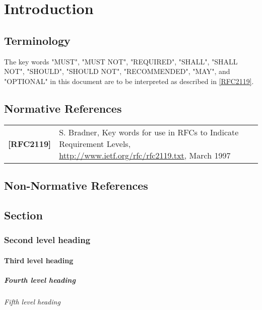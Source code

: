 \chapter{Introduction}

\section{Terminology}

The key words "MUST", "MUST NOT", "REQUIRED", "SHALL", "SHALL NOT", "SHOULD", "SHOULD NOT", "RECOMMENDED", "MAY", and "OPTIONAL" in this document are to be interpreted as described in \hyperref[intro:rfc2119]{[RFC2119]}.


\section{Normative References}

\begin{longtable}{l p{5in}}
	\label{intro:rfc2119}\textbf{[RFC2119]} & S. Bradner, Key words for use in RFCs to Indicate Requirement Levels, \newline\url{http://www.ietf.org/rfc/rfc2119.txt}, March 1997\\
\end{longtable}


\section{Non-Normative References}





\newpage
\section{Section}


\subsection{Second level heading}
\subsubsection{Third level heading}
\paragraph{Fourth level heading}
\subparagraph{Fifth level heading}


